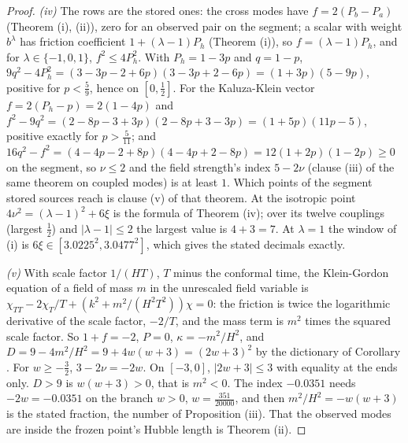 \begin{proof}
\emph{(iv)} The rows are the stored ones: the cross modes have $f = 2(P_{b} - P_{a})$ (Theorem (i), (ii)), zero for an observed pair on the segment; a scalar with weight $b^{\lambda}$ has friction coefficient $1 + (\lambda - 1)P_{h}$ (Theorem (i)), so $f = (\lambda - 1)P_{h}$, and for $\lambda \in \{-1, 0, 1\}$, $f^{2} \le 4P_{h}^{2}$. With $P_{h} = 1 - 3p$ and $q = 1 - p$, $9q^{2} - 4P_{h}^{2} = (3 - 3p - 2 + 6p)(3 - 3p + 2 - 6p) = (1 + 3p)(5 - 9p)$, positive for $p < \tfrac59$, hence on $[0, \tfrac12]$. For the Kaluza-Klein vector $f = 2(P_{h} - p) = 2(1 - 4p)$ and $f^{2} - 9q^{2} = (2 - 8p - 3 + 3p)(2 - 8p + 3 - 3p) = (1 + 5p)(11p - 5)$, positive exactly for $p > \tfrac{5}{11}$; and $16q^{2} - f^{2} = (4 - 4p - 2 + 8p)(4 - 4p + 2 - 8p) = 12(1 + 2p)(1 - 2p) \ge 0$ on the segment, so $\nu \le 2$ and the field strength's index $5 - 2\nu$ (clause (iii) of the same theorem on coupled modes) is at least $1$. Which points of the segment stored sources reach is clause (v) of that theorem. At the isotropic point $4\nu^{2} = (\lambda - 1)^{2} + 6\xi$ is the formula of Theorem (iv); over its twelve couplings (largest $\tfrac12$) and $|\lambda - 1| \le 2$ the largest value is $4 + 3 = 7$. At $\lambda = 1$ the window of (i) is $6\xi \in [3.0225^{2}, 3.0477^{2}]$, which gives the stated decimals exactly.

\emph{(v)} With scale factor $1/(HT)$, $T$ minus the conformal time, the Klein-Gordon equation of a field of mass $m$ in the unrescaled field variable is $\chi_{TT} - 2\chi_{T}/T + (k^{2} + m^{2}/(H^{2}T^{2}))\chi = 0$: the friction is twice the logarithmic derivative of the scale factor, $-2/T$, and the mass term is $m^{2}$ times the squared scale factor. So $1 + f = -2$, $P = 0$, $\kappa = -m^{2}/H^{2}$, and $D = 9 - 4m^{2}/H^{2} = 9 + 4w(w + 3) = (2w + 3)^{2}$ by the dictionary of Corollary . For $w \ge -\tfrac32$, $3 - 2\nu = -2w$. On $[-3, 0]$, $|2w + 3| \le 3$ with equality at the ends only. $D > 9$ is $w(w + 3) > 0$, that is $m^{2} < 0$. The index $-0.0351$ needs $-2w = -0.0351$ on the branch $w > 0$, $w = \tfrac{351}{20000}$, and then $m^{2}/H^{2} = -w(w + 3)$ is the stated fraction, the number of Proposition (iii). That the observed modes are inside the frozen point's Hubble length is Theorem (ii).


\end{proof}
